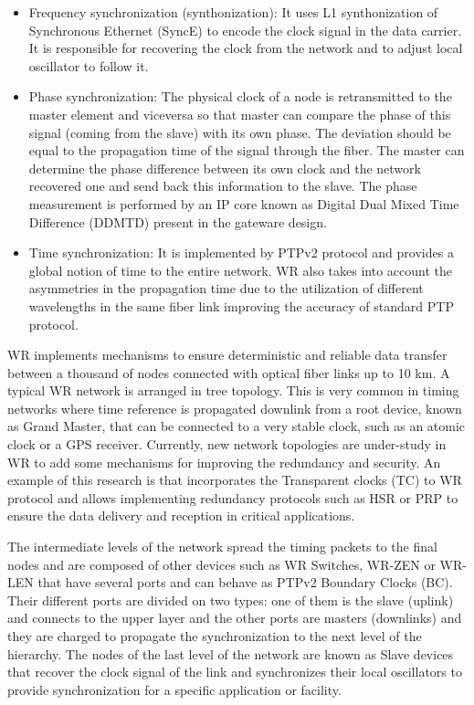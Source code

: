 \begin{itemize}
	\item {Frequency synchronization (synthonization): It uses L1 synthonization of Synchronous Ethernet (SyncE) to encode the clock signal in the data carrier. It is responsible for recovering the clock from the network and to adjust local oscillator to follow it.}
	\item {Phase synchronization: The physical clock of a node is retransmitted to the master element and viceversa so that master can compare the phase of this signal (coming from the slave) with its own phase. The deviation should be equal to the propagation time of the signal through the fiber. The master can determine the phase difference between its own clock and the network recovered one and send back this information to the slave. The phase measurement is performed by an IP core known as Digital Dual Mixed Time Difference (DDMTD) present in the gateware design.}
	\item {Time synchronization: It is implemented by PTPv2 protocol and provides a global notion of time to the entire network. WR also takes into account the asymmetries in the propagation time due to the utilization of different wavelengths in the same fiber link improving the accuracy of standard PTP protocol.}
\end{itemize}


WR implements mechanisms to ensure deterministic and reliable data transfer between a thousand of nodes connected with  optical fiber links up to 10 km. A typical WR network is arranged in tree topology. This is very common in timing networks where time reference is propagated downlink from a root device, known as Grand Master, that can be connected to a very stable clock, such as an atomic clock or a GPS receiver. Currently, new network topologies are under-study in WR to add some mechanisms for improving the redundancy and security. An example of this research is \cite{jlgutierrez-paper-redundancy} that incorporates the Transparent clocks (TC) to WR protocol and allows implementing redundancy protocols such as HSR or PRP to ensure the data delivery and reception in critical applications.

The intermediate levels of the network spread the timing packets to the final nodes and are composed of other devices such as WR Switches, WR-ZEN or WR-LEN that have several ports and can behave as PTPv2 Boundary Clocks (BC). Their different ports are divided on two types: one of them is the slave (uplink) and connects to the upper layer and the other ports are masters (downlinks) and they are charged to propagate the synchronization to the next level of the hierarchy. The nodes of the last level of the network are known as Slave devices that recover the clock signal of the link and synchronizes their local oscillators to provide synchronization for a specific application or facility.

